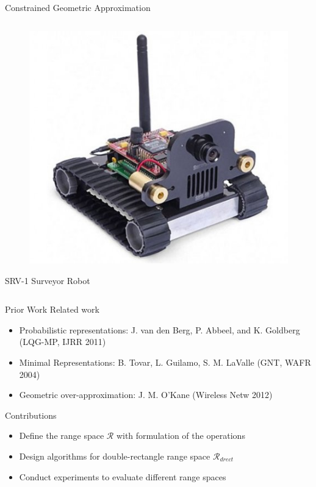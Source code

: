 \documentclass[10pt]{beamer}
\begin{document}
\begin{frame}{Constrained Geometric Approximation}
\begin{columns}
\begin{column}{.35\textwidth}
\begin{figure}
    \includegraphics[scale=0.2]{figs/srvq.jpg}
    \end{figure}
    SRV-1 Surveyor Robot
  \end{column}
\end{columns}
\end{frame}

\begin{frame}{Prior Work}
Related work
\begin{itemize}
\item Probabilistic representations: J. van den Berg,
  P. Abbeel, and K. Goldberg (LQG-MP, IJRR 2011)
\item Minimal Representations: B. Tovar, L. Guilamo, S. M. LaValle (GNT, WAFR 2004)
\item Geometric over-approximation: J. M. O'Kane (Wireless Netw 2012)
\end{itemize}
Contributions
\begin{itemize}
\item Define the range space $\mathcal{R}$ with formulation of the operations
\item Design algorithms for double-rectangle range space $\mathcal{R}_{drect}$
\item Conduct experiments to evaluate different range spaces
\end{itemize}
\end{frame}
\end{document}
